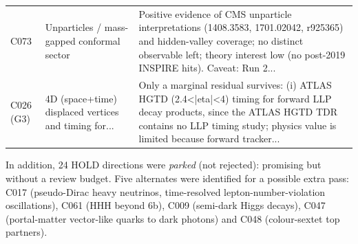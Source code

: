 \documentclass[11pt,a4paper]{article}
\begin{document}
\begin{center}
\begin{tabular}{@{}l p{4.3cm} p{8cm}@{}}
C073 & Unparticles / mass-gapped conformal sector & Positive evidence of CMS unparticle interpretations (1408.3583, 1701.02042, r925365) and hidden-valley coverage; no distinct observable left; theory interest low (no post-2019 INSPIRE hits). Caveat: Run 2...\\
C026 (G3) & 4D (space+time) displaced vertices and timing for... & Only a marginal residual survives: (i) ATLAS HGTD (2.4<|eta|<4) timing for forward LLP decay products, since the ATLAS HGTD TDR contains no LLP timing study; physics value is limited because forward tracker...\\
\bottomrule\end{tabular}\end{center}
In addition, 24 HOLD directions were \emph{parked} (not rejected): promising but without a review budget. Five alternates were identified for a possible extra pass: C017 (pseudo-Dirac heavy neutrinos, time-resolved lepton-number-violation oscillations), C061 (HHH beyond 6b), C009 (semi-dark Higgs decays), C047 (portal-matter vector-like quarks to dark photons) and C048 (colour-sextet top partners).
\end{document}

